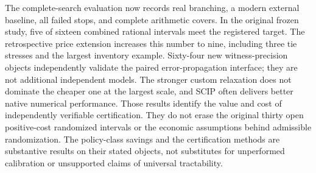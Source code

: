 The complete-search evaluation now records real branching, a modern external baseline, all failed stops, and complete arithmetic covers. In the original frozen study, five of sixteen combined rational intervals meet the registered target. The retrospective price extension increases this number to nine, including three tie stresses and the largest inventory example. Sixty-four new witness-precision objects independently validate the paired error-propagation interface; they are not additional independent models. The stronger custom relaxation does not dominate the cheaper one at the largest scale, and SCIP often delivers better native numerical performance. Those results identify the value and cost of independently verifiable certification. They do not erase the original thirty open positive-cost randomized intervals or the economic assumptions behind admissible randomization. The policy-class savings and the certification methods are substantive results on their stated objects, not substitutes for unperformed calibration or unsupported claims of universal tractability.
